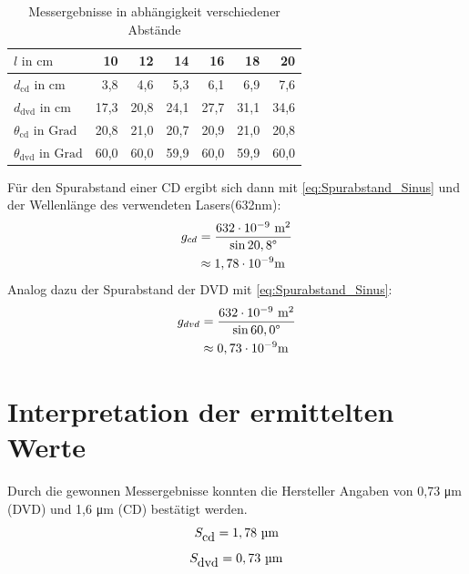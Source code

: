\documentclass[9pt,twocolumn,twoside]{pnas-new}
\begin{document}
\begin{table}%
\centering
\caption{Messergebnisse in abhängigkeit verschiedener Abstände}
\begin{tabular}{lrrrrrr}
\begin{math} l \mbox{ in cm} \end{math} & 10 & 12 & 14 & 16 & 18 & 20 \\
\midrule
\begin{math}d_{\mbox{cd}} \mbox{ in cm} \end{math} & 3,8 & 4,6 & 5,3 & 6,1 & 6,9 & 7,6 \\
\begin{math}d_{\mbox{dvd}} \mbox{ in cm} \end{math} & 17,3 & 20,8 & 24,1 & 27,7 & 31,1 & 34,6 \\
\begin{math}\theta_{\mbox{cd}} \mbox{ in Grad} \end{math}& 20,8 & 21,0 & 20,7 & 20,9 & 21,0 & 20,8 \\
\begin{math}\theta_{\mbox{dvd}} \mbox{ in Grad} \end{math} & 60,0 & 60,0 & 59,9 & 60,0 & 59,9 & 60,0  \\
\bottomrule
\end{tabular}

\end{table}

Für den Spurabstand einer CD ergibt sich dann mit \eqref{eq:Spurabstand_Sinus} und der Wellenlänge des verwendeten Lasers(632\si{\nano\metre}):
\begin{align*}
 g_{cd} &= \frac{632\cdot10^{-9}\mbox{ m}^2}{\sin{20,8\mbox{\textdegree}}}\\
 &\approx 1,78 \cdot 10^{-9}\mbox{m}
\end{align*}
Analog dazu der Spurabstand der DVD mit \eqref{eq:Spurabstand_Sinus}:
\begin{align*}
 g_{dvd} &= \frac{632\cdot10^{-9}\mbox{ m}^2}{\sin{60,0\mbox{\textdegree}}}\\
 &\approx 0,73 \cdot 10^{-9}\mbox{m}
\end{align*}


\section*{Interpretation der ermittelten Werte}
Durch die gewonnen Messergebnisse konnten die Hersteller Angaben von 0,73 \si{\micro\metre} (DVD) \cite{ECMA1300} und  1,6 \si{\micro\metre} (CD) \cite{ECMA359} bestätigt werden.
\begin{equation} \label{eq:cdspur} S_{\mbox{cd}} =  1,78\mbox{ \textmu m}  \end{equation}
\begin{equation} \label{eq:dvdspur} S_{\mbox{dvd}} =  0,73\mbox{ \textmu m}  \end{equation} 
\end{document}
